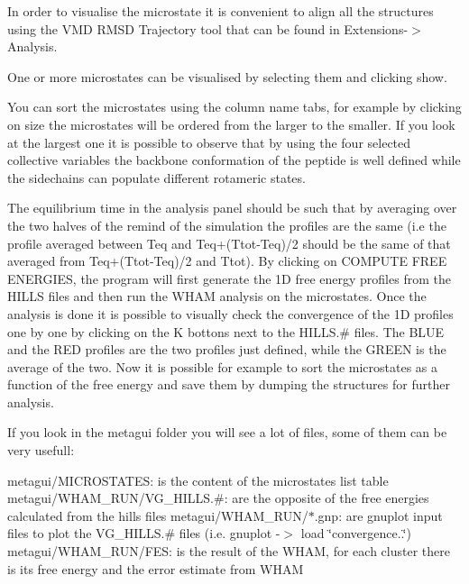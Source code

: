 In order to visualise the microstate it is convenient to align all the structures using the V\+M\+D R\+M\+S\+D Trajectory tool that can be found in Extensions-\/$>$Analysis.

One or more microstates can be visualised by selecting them and clicking show.

You can sort the microstates using the column name tabs, for example by clicking on size the microstates will be ordered from the larger to the smaller. If you look at the largest one it is possible to observe that by using the four selected collective variables the backbone conformation of the peptide is well defined while the sidechains can populate different rotameric states.

The equilibrium time in the analysis panel should be such that by averaging over the two halves of the remind of the simulation the profiles are the same (i.\+e the profile averaged between Teq and Teq+(Ttot-\/\+Teq)/2 should be the same of that averaged from Teq+(Ttot-\/\+Teq)/2 and Ttot). By clicking on C\+O\+M\+P\+U\+T\+E F\+R\+E\+E E\+N\+E\+R\+G\+I\+E\+S, the program will first generate the 1\+D free energy profiles from the H\+I\+L\+L\+S files and then run the W\+H\+A\+M analysis on the microstates. Once the analysis is done it is possible to visually check the convergence of the 1\+D profiles one by one by clicking on the K bottons next to the H\+I\+L\+L\+S.\# files. The B\+L\+U\+E and the R\+E\+D profiles are the two profiles just defined, while the G\+R\+E\+E\+N is the average of the two. Now it is possible for example to sort the microstates as a function of the free energy and save them by dumping the structures for further analysis.

\label{belfast-8_belfast-8-mg1-fig}%
\hypertarget{belfast-8_belfast-8-mg1-fig}{}%


If you look in the metagui folder you will see a lot of files, some of them can be very usefull\+:

metagui/\+M\+I\+C\+R\+O\+S\+T\+A\+T\+E\+S\+: is the content of the microstates list table metagui/\+W\+H\+A\+M\+\_\+\+R\+U\+N/\+V\+G\+\_\+\+H\+I\+L\+L\+S.\#\+: are the opposite of the free energies calculated from the hills files metagui/\+W\+H\+A\+M\+\_\+\+R\+U\+N/$\ast$.gnp\+: are gnuplot input files to plot the V\+G\+\_\+\+H\+I\+L\+L\+S.\# files (i.\+e. gnuplot -\/$>$ load \char`\"{}convergence..\char`\"{}) metagui/\+W\+H\+A\+M\+\_\+\+R\+U\+N/\+F\+E\+S\+: is the result of the W\+H\+A\+M, for each cluster there is its free energy and the error estimate from W\+H\+A\+M

